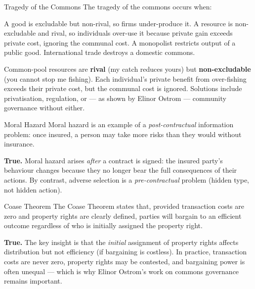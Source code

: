 \documentclass[paper=a5]{scrartcl}
\begin{document}
\begin{question}[type=mc]{Tragedy of the Commons}
The tragedy of the commons occurs when:
\begin{choices}
  \choice        A good is excludable but non-rival, so firms under-produce it.
  \correctchoice A resource is non-excludable and rival, so individuals over-use
                 it because private gain exceeds private cost, ignoring the
                 communal cost.
  \choice        A monopolist restricts output of a public good.
  \choice        International trade destroys a domestic commons.
\end{choices}
\begin{solution}
  Common-pool resources are \textbf{rival} (my catch reduces yours) but
  \textbf{non-excludable} (you cannot stop me fishing). Each individual's
  private benefit from over-fishing exceeds their private cost, but the
  communal cost is ignored. Solutions include privatisation, regulation, or
  — as shown by Elinor Ostrom — community governance without either.
\end{solution}
\end{question}

\begin{question}[type=tf]{Moral Hazard}
Moral hazard is an example of a \emph{post-contractual} information problem:
once insured, a person may take more risks than they would without insurance.
\truefalse[true]
\begin{solution}
  \textbf{True.} Moral hazard arises \emph{after} a contract is signed: the
  insured party's behaviour changes because they no longer bear the full
  consequences of their actions. By contrast, adverse selection is a
  \emph{pre-contractual} problem (hidden type, not hidden action).
\end{solution}
\end{question}

\begin{question}[type=tf]{Coase Theorem}
The Coase Theorem states that, provided transaction costs are zero and property
rights are clearly defined, parties will bargain to an efficient outcome
regardless of who is initially assigned the property right.
\truefalse[true]
\begin{solution}
  \textbf{True.} The key insight is that the \emph{initial} assignment of
  property rights affects distribution but not efficiency (if bargaining is
  costless). In practice, transaction costs are never zero, property rights may
  be contested, and bargaining power is often unequal — which is why Elinor
  Ostrom's work on commons governance remains important.
\end{solution}
\end{question}
\end{document}
